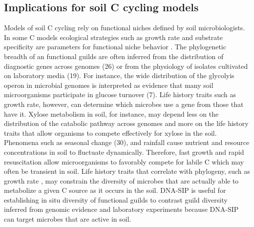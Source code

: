 \subsection{Implications for soil C cycling models}
Models of soil C cycling rely on functional niches defined by soil
microbiologists. In some C models ecological strategies such as growth rate and
substrate specificity are parameters for functional niche behavior
\citep{Kaiser2014a}. The phylogenetic breadth of an functional guilds are often
inferred from the distribution of diagnostic genes across genomes \citep{}(26) or from
the physiology of isolates cultivated on laboratory media \citep{}(19). For instance,
the wide distribution of the glycolyis operon in microbial genomes is
interpreted as evidence that many soil microorganisms participate in glucose
turnover (7). Life history traits such as growth rate, however, can determine
which microbes use a gene from those that have it. Xylose metabolism in soil,
for instance, may depend less on the distribution of the catabolic pathway
across genomes and more on the life history traits that allow organisms to
compete effectively for xylose in the soil. Phenomena such as seasonal
change \citep{}(30), and rainfall \citep{Evans2014a} cause nutrient and resource
concentrations in soil to fluctuate dynamically. Therefore, fast growth
and rapid resuscitation allow microorganisms to favorably
compete for labile C which may often be transient in soil. Life history
traits that correlate with phylogeny, such as growth rate
\citep{Fierer2007}, may constrain the diversity of microbes that are
actually able to metabolize a given C source as it occurs in the soil.
DNA-SIP is useful for establishing in situ diversity of functional guilds
to contrast guild diversity inferred from genomic evidence and laboratory
experiments because DNA-SIP can target microbes that are active in soil. 


